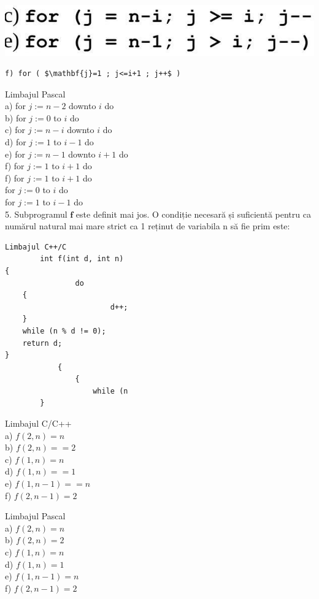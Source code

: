 \documentclass[10pt]{article}
\begin{document}
\begin{center}
\includegraphics[max width=\textwidth]{2025_04_17_46e04c6acd873ea9558dg-155(2)}
\end{center}

\begin{verbatim}
f) for ( $\mathbf{j}=1 ; j<=i+1 ; j++$ )
\end{verbatim}

Limbajul Pascal\\
a) for $j:=n-2$ downto $i$ do\\
b) for $j:=0$ to $i$ do\\
c) for $j:=n-i$ downto $i$ do\\
d) for $j:=1$ to $i-1$ do\\
e) for $j:=n-1$ downto $i+1$ do\\
f) for $j:=1$ to $i+1$ do\\
f) for $j:=1$ to $i+1$ do\\
for $j:=0$ to $i$ do\\
for $j:=1$ to $i-1$ do\\
5. Subprogramul $\mathbf{f}$ este definit mai jos. O condiție necesară și suficientă pentru ca numărul natural mai mare strict ca 1 reținut de variabila n să fie prim este:

\begin{verbatim}
Limbajul C++/C
        int f(int d, int n)
{
                do
    {
                        d++;
    }
    while (n % d != 0);
    return d;
}
            {
                {
                    while (n
        }
\end{verbatim}

Limbajul C/C++\\
a) $f(2, n)=n$\\
b) $f(2, n)==2$\\
c) $f(1, n)=n$\\
d) $f(1, n)==1$\\
e) $f(1, n-1)==n$\\
f) $f(2, n-1)=2$

Limbajul Pascal\\
a) $f(2, n)=n$\\
b) $f(2, n)=2$\\
c) $f(1, n)=n$\\
d) $f(1, n)=1$\\
e) $f(1, n-1)=n$\\
f) $f(2, n-1)=2$
\end{document}
